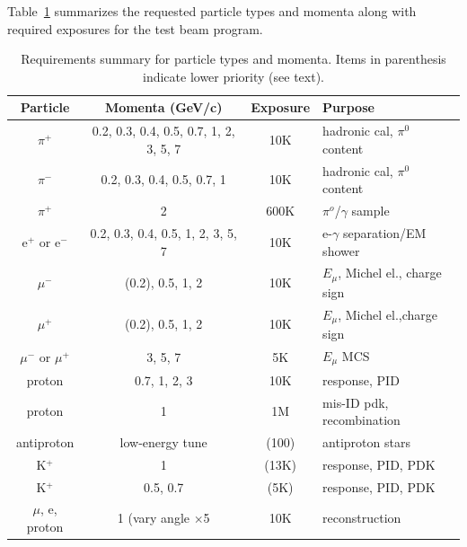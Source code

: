 Table~\ref{tab:runsum} summarizes the requested particle types and momenta along with 
required exposures for the test beam program.
\begin{table}[h]
\centering
\begin{tabular}{|c|c|c|l|}
\hline
Particle & Momenta (GeV/c) & Exposure & Purpose \\ \hline
$\pi^+$       & 0.2, 0.3, 0.4, 0.5, 0.7, 1, 2, 3, 5, 7     &  10K  & hadronic cal, $\pi^0$ content \\ \hline
$\pi^-$       &  0.2, 0.3, 0.4, 0.5, 0.7, 1     &  10K  & hadronic cal, $\pi^0$ content \\ \hline
$\pi^+$   &  2  &  600K & $\pi^o$/$\gamma$ sample \\ \hline
e$^+$ or e$^-$       &    0.2, 0.3, 0.4, 0.5, 1, 2, 3, 5, 7        &    10K   & e-$\gamma$ separation/EM shower     \\ \hline
$\mu^-$  &   (0.2), 0.5, 1, 2  &  10K & $E_\mu$, Michel el., charge sign \\ \hline
$\mu^+$ &   (0.2), 0.5, 1, 2   &  10K & $E_\mu$, Michel el.,charge sign  \\ \hline
$\mu^-$ or $\mu^+$ &   3, 5, 7  &  5K & $E_\mu$ MCS \\ \hline
proton &  0.7, 1, 2, 3   &  10K & response, PID \\ \hline
proton &  1   &  1M & mis-ID pdk, recombination \\ \hline
antiproton &  low-energy tune  &  (100) & antiproton stars \\ \hline
K$^+$  & 1 & (13K)   &   response, PID, PDK  \\ \hline
K$^+$  & 0.5, 0.7 & (5K)   &   response, PID, PDK  \\ \hline \hline
$\mu$, e, proton  & 1 (vary angle $\times$5 & 10K  & reconstruction  \\ \hline
\end{tabular}
\caption{Requirements summary for particle types and momenta. Items in parenthesis indicate lower priority (see text).
}
\label{tab:runsum}
\end{table}



